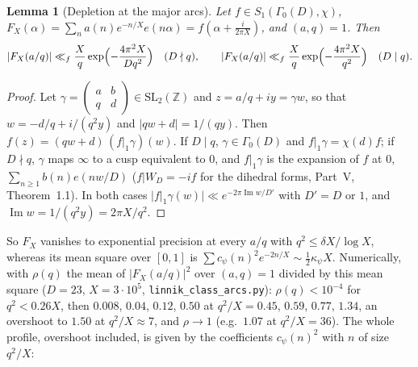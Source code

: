 \documentclass[11pt]{amsart}
\newtheorem{lemma}[theorem]{Lemma}
\theoremstyle{remark}
\newcommand{\Z}{\mathbb Z}
\begin{document}
\begin{lemma}[Depletion at the major arcs]\label{lem:depletion}
Let $f\in S_1(\Gamma_0(D),\chi)$, $F_X(\alpha)=\sum_na(n)e^{-n/X}e(n\alpha)=f(\alpha+\frac i{2\pi X})$, and $(a,q)=1$. Then
\[
|F_X(a/q)|\ll_f\frac Xq\exp\Bigl(-\frac{4\pi^2X}{Dq^2}\Bigr)\quad(D\nmid q),\qquad |F_X(a/q)|\ll_f\frac Xq\exp\Bigl(-\frac{4\pi^2X}{q^2}\Bigr)\quad(D\mid q).
\]
\end{lemma}
\begin{proof}
Let $\gamma=\left(\begin{smallmatrix}a&b\\q&d\end{smallmatrix}\right)\in\mathrm{SL}_2(\Z)$ and $z=a/q+iy=\gamma w$, so that $w=-d/q+i/(q^2y)$ and $|qw+d|=1/(qy)$. Then $f(z)=(qw+d)\,(f|_1\gamma)(w)$. If $D\mid q$, $\gamma\in\Gamma_0(D)$ and $f|_1\gamma=\chi(d)f$; if $D\nmid q$, $\gamma$ maps $\infty$ to a cusp equivalent to $0$, and $f|_1\gamma$ is the expansion of $f$ at $0$, $\sum_{n\ge1}b(n)e(nw/D)$ ($f|W_D=-if$ for the dihedral forms, Part~V, Theorem~1.1). In both cases $|f|_1\gamma(w)|\ll e^{-2\pi\operatorname{Im}w/D'}$ with $D'=D$ or $1$, and $\operatorname{Im}w=1/(q^2y)=2\pi X/q^2$.
\end{proof}

So $F_X$ vanishes to exponential precision at every $a/q$ with $q^2\le\delta X/\log X$, whereas its mean square over $[0,1]$ is $\sum c_\psi(n)^2e^{-2n/X}\sim\frac12\kappa_\psi X$. Numerically, with $\rho(q)$ the mean of $|F_X(a/q)|^2$ over $(a,q)=1$ divided by this mean square ($D=23$, $X=3\cdot10^5$, \texttt{linnik\_class\_arcs.py}): $\rho(q)<10^{-4}$ for $q^2<0.26X$, then $0.008$, $0.04$, $0.12$, $0.50$ at $q^2/X=0.45$, $0.59$, $0.77$, $1.34$, an overshoot to $1.50$ at $q^2/X\approx7$, and $\rho\to1$ (e.g.\ $1.07$ at $q^2/X=36$). The whole profile, overshoot included, is given by the coefficients $c_\psi(n)^2$ with $n$ of size $q^2/X$:
\end{document}
